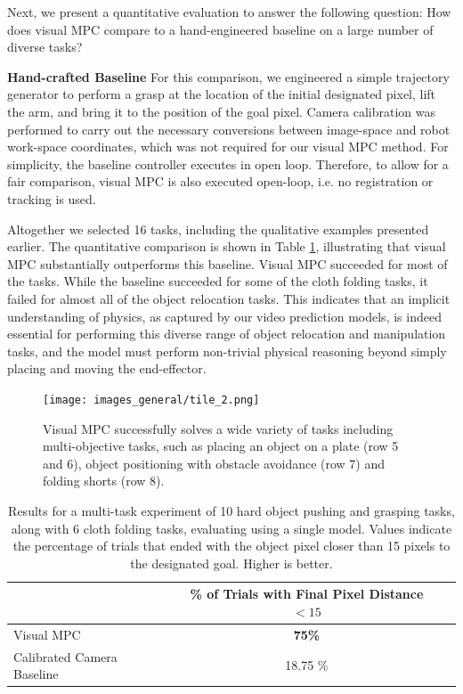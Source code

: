 Next, we present a quantitative evaluation to answer the following question: How does visual MPC compare to a hand-engineered baseline on a large number of diverse tasks?

\noindent \textbf{Hand-crafted Baseline} For this comparison, we engineered a simple trajectory generator to perform a grasp at the location of the initial designated pixel, lift the arm, and bring it to the position of the goal pixel. Camera calibration was performed to carry out the necessary conversions between image-space and robot work-space coordinates, which was not required for our visual MPC method. For simplicity, the baseline controller executes in open loop. Therefore, to allow for a fair comparison, visual MPC is also executed open-loop, i.e. no registration or tracking is used.

Altogether we selected 16 tasks, including the qualitative examples presented earlier.
The quantitative comparison is shown in Table \ref{table:cloth_folding}, illustrating that visual MPC substantially outperforms this baseline.
Visual MPC succeeded for most of the tasks. While the baseline succeeded for some of the cloth folding tasks, it failed for almost all of the object relocation tasks. This indicates that an implicit understanding of physics, as captured by our video prediction models, is indeed essential for performing this diverse range of object relocation and manipulation tasks, and the model must perform non-trivial physical reasoning beyond simply placing and moving the end-effector.


\begin{figure}
	\centering
	\texttt{[image: images\_general/tile\_2.png]}
	\caption{Visual MPC successfully solves a wide variety of tasks including multi-objective tasks, such as placing an object on a plate (row 5 and 6), object positioning with obstacle avoidance (row 7) and folding shorts (row 8).   
		\label{fig:tile_2}}
\end{figure}

\label{subsec:cloth_folding_data}
\begin{table}
\centering
{\footnotesize
\begin{tabular}{lcc}
	\toprule
         &  \thead{\% of Trials with \\ Final Pixel Distance $< 15$}   \\
         \midrule
  Visual MPC & \textbf{75\%} \\ 
  Calibrated Camera Baseline & 18.75 \% \\
  \bottomrule
\end{tabular}
}
\caption{Results for a multi-task experiment of 10 hard object pushing and grasping tasks, along with 6 cloth folding tasks, evaluating using a single model. Values indicate the percentage of trials that ended with the object pixel closer than 15 pixels to the designated goal. Higher is better.} 
\label{table:cloth_folding}
\end{table}

